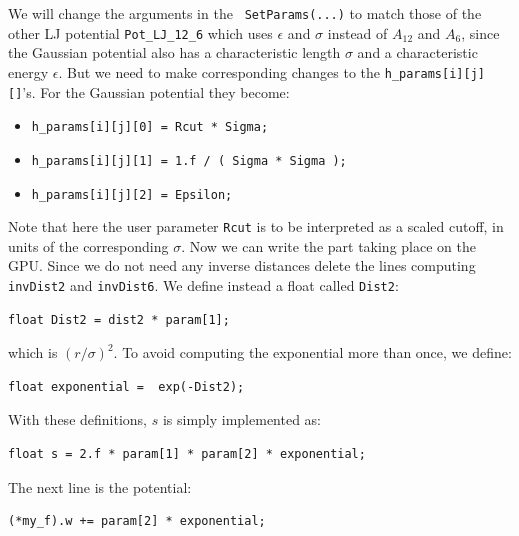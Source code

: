 We will change the arguments in the \verb| SetParams(...)| to match those of
the other LJ potential \verb|Pot_LJ_12_6| which uses $\epsilon$ and $\sigma$ 
instead of $A_{12}$ and $A_6$, since
the Gaussian potential also has a characteristic length $\sigma$ and a 
characteristic energy $\epsilon$. But we need to make corresponding
changes to the \verb|h_params[i][j][]|'s. For the Gaussian potential they
become: 
\begin{itemize}
  \item \verb|h_params[i][j][0] = Rcut * Sigma;|
  \item \verb|h_params[i][j][1] = 1.f / ( Sigma * Sigma );|
  \item \verb|h_params[i][j][2] = Epsilon;|
\end{itemize}
Note that here the user parameter \verb|Rcut| is to be interpreted as a scaled
cutoff, in units of the corresponding $\sigma$.
 Now we can write the part taking place on the GPU. Since we do
not need any inverse distances delete the lines computing 
\verb|invDist2| and \verb|invDist6|. We define instead a 
float called \verb|Dist2|:
\begin{verbatim} 
float Dist2 = dist2 * param[1];
\end{verbatim}
which is $(r/\sigma)^2$. To avoid computing the exponential more than once, we define:
\begin{verbatim} 
float exponential =  exp(-Dist2);
\end{verbatim}
With these definitions, $s$ is simply implemented as:
\begin{verbatim}
float s = 2.f * param[1] * param[2] * exponential;
\end{verbatim}
The next line is the potential:
\begin{verbatim}
(*my_f).w += param[2] * exponential;
\end{verbatim}

